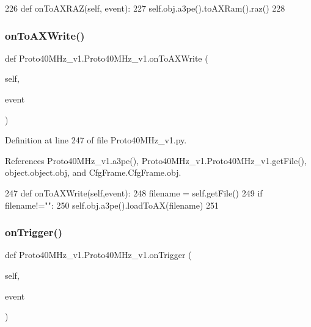\begin{DoxyCode}
226     \textcolor{keyword}{def }onToAXRAZ(self, event):
227         self.obj.a3pe().toAXRam().raz()
228 
\end{DoxyCode}
\mbox{\label{classProto40MHz__v1_1_1Proto40MHz__v1_a0111c0c34c35554f5775a2ebfd651d2d}} 
\subsubsection{\texorpdfstring{on\+To\+A\+X\+Write()}{onToAXWrite()}}
{\footnotesize\ttfamily def Proto40\+M\+Hz\+\_\+v1.\+Proto40\+M\+Hz\+\_\+v1.\+on\+To\+A\+X\+Write (\begin{DoxyParamCaption}\item[{}]{self,  }\item[{}]{event }\end{DoxyParamCaption})}



Definition at line 247 of file Proto40\+M\+Hz\+\_\+v1.\+py.



References Proto40\+M\+Hz\+\_\+v1.\+a3pe(), Proto40\+M\+Hz\+\_\+v1.\+Proto40\+M\+Hz\+\_\+v1.\+get\+File(), object.\+object.\+obj, and Cfg\+Frame.\+Cfg\+Frame.\+obj.


\begin{DoxyCode}
247     \textcolor{keyword}{def }onToAXWrite(self,event):
248         filename = self.getFile()
249         \textcolor{keywordflow}{if} filename!=\textcolor{stringliteral}{""}:
250             self.obj.a3pe().loadToAX(filename)
251 
\end{DoxyCode}
\mbox{\label{classProto40MHz__v1_1_1Proto40MHz__v1_ad3639b823f80b8a837d5c6b0240dfa04}} 
\subsubsection{\texorpdfstring{on\+Trigger()}{onTrigger()}}
{\footnotesize\ttfamily def Proto40\+M\+Hz\+\_\+v1.\+Proto40\+M\+Hz\+\_\+v1.\+on\+Trigger (\begin{DoxyParamCaption}\item[{}]{self,  }\item[{}]{event }\end{DoxyParamCaption})}



